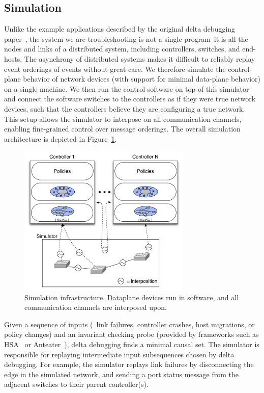 \subsection{Simulation}
\label{subsec:simulation}

Unlike the example applications described
by the original delta debugging paper~\cite{Zeller:1999:YMP:318773.318946}, the system we are troubleshooting is not a
single program--it is all the nodes and links of a distributed system,
including controllers, switches, and end-hosts. The asynchrony of distributed
systems makes it difficult to reliably replay event orderings of
events without great care. We therefore simulate the control-plane
behavior of network devices (with support for minimal data-plane behavior) on
a single machine. We then run the control software on
top of this simulator and connect the software switches to the controllers as if they were true
network devices, such that the controllers believe they are configuring a true
network. This setup allows the simulator to interpose on all communication
channels, enabling fine-grained control over message orderings. The overall
simulation architecture is depicted in
Figure~\ref{fig:architecture}.

\begin{figure}[t]
    \includegraphics[width=3.25in]{../diagrams/architecture/Debugger_Architecture.pdf}
    \caption[]{\label{fig:architecture} Simulation infrastructure. Dataplane
    devices run in software, and all communication channels are
    interposed upon.}
\end{figure}

Given a sequence of inputs (\eg~link failures, controller crashes, host migrations,
or policy changes) and an invariant checking probe (provided by frameworks
such as HSA~\cite{hsa,hsa_realtime} or Anteater~\cite{anteater,khurshid2012veriflow}),
delta debugging finds a minimal causal set. The
simulator is responsible for replaying intermediate input subsequences
chosen by delta debugging. For example, the simulator replays link failures
by disconnecting the edge in the simulated network, and sending a
port status message from the adjacent switches to their parent controller(s).

